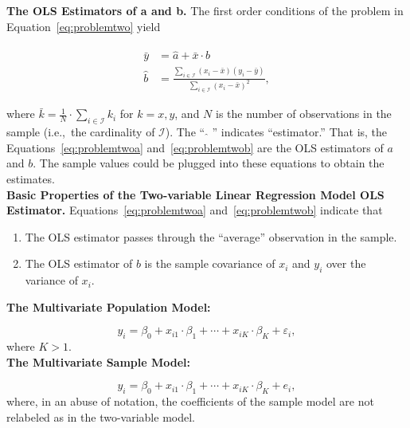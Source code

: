 \noindent \textbf{The OLS Estimators of a and b.} The first order conditions of the problem in Equation~\eqref{eq:problemtwo} yield

\begin{align}
		\bar{y} & =   \hat{a}  +  \bar{x} \cdot \hat{b} \label{eq:problemtwoa} \\
		\hat{b} & =  \frac{ \sum \limits _{i \in \mathcal{I} } \left( x_{i} - \bar{x} \right)  \left( y_{i} - \bar{y} \right) } { \sum \limits _{i \in \mathcal{I} } { \left( x_{i} - \bar{x} \right) }^2 } \label{eq:problemtwob}, 
\end{align}

\noindent where $\bar{k} = \frac{1}{N} \cdot \sum \limits _{i \in \mathcal{I} } k_{i}$ for $k = x, y$, and $N$ is the number of observations in the sample (i.e.,\ the cardinality of $\mathcal{I}$). The `` $\hat{ }$ '' indicates ``estimator.'' That is, the Equations~\eqref{eq:problemtwoa} and~\eqref{eq:problemtwob} are the OLS estimators of $a$ and $b$. The sample values could be plugged into these equations to obtain the estimates.\\ 

\noindent \textbf{Basic Properties of the Two-variable Linear Regression Model OLS Estimator.} Equations~\eqref{eq:problemtwoa} and~\eqref{eq:problemtwob} indicate that
\begin{enumerate}
	\item The OLS estimator passes through the ``average'' observation in the sample. 
	\item The OLS estimator of $b$ is the sample covariance of $x_i$ and $y_i$ over the variance of $x_i$. 
\end{enumerate}

\noindent \textbf{The Multivariate Population Model:}

\begin{equation}
y_i = \beta_0 + x_{i1} \cdot \beta_1 + \cdots + x_{iK} \cdot \beta_K  + \varepsilon_i, 
\end{equation}
\noindent where $K > 1$.\\

\noindent \textbf{The Multivariate Sample Model:}

\begin{equation}
y_i = \beta_0 + x_{i1} \cdot \beta_1 + \cdots + x_{iK} \cdot \beta_K  + e_i,
\end{equation}
\noindent where, in an abuse of notation, the coefficients of the sample model are not relabeled as in the two-variable model.\\

